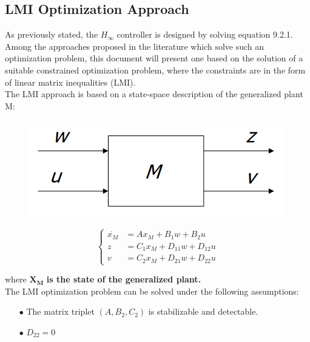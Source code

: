 \documentclass[a4paper,10pt,titlepage]{article}
\numberwithin{equation}{subsection}
\begin{document}
	\subsection{LMI Optimization Approach}
	As previously stated, the $H_\infty$ controller is designed by solving equation 9.2.1.\\
	\vspace{2pt}
	Among the approaches proposed in the literature which solve such an optimization problem, this document will present one based on the solution of a suitable constrained optimization problem, where the constraints are in the form of linear matrix inequalities (LMI).\\
	\vspace{2pt}
	The LMI approach is based on a state-space description of the generalized plant M:
	
	\begin{figure}[H]
		\begin{minipage}{0.3\textwidth}
			\centering
			\includegraphics[width=\linewidth]{images/generalized_plant_small.png}
			\label{fig:image13}
		\end{minipage}
		\centering
		\begin{minipage}{0.5\textwidth}
			\vspace{-20pt}
			\begin{equation}
				\left\{
				\begin{aligned}
					\dot{x_M} &= Ax_M + B_1w + B_2u \\
					z &= C_1x_M + D_{11}w + D_{12}u \\
					v &= C_2x_M + D_{21}w + D_{22}u
				\end{aligned}
				\right.
			\end{equation}
		\end{minipage}
	\end{figure}
	where $\bm{X_M}$ \textbf{is the state of the generalized plant.} \\
	\vspace{2pt}
	The LMI optimization problem can be solved under the following assumptions:
	\begin{enumerate}
		\item[$\bullet$] The matrix triplet $(A,B_2,C_2)$ is stabilizable and detectable.
		\item[$\bullet$] $D_{22} = 0$ 
	\end{enumerate}
	
\end{document}
